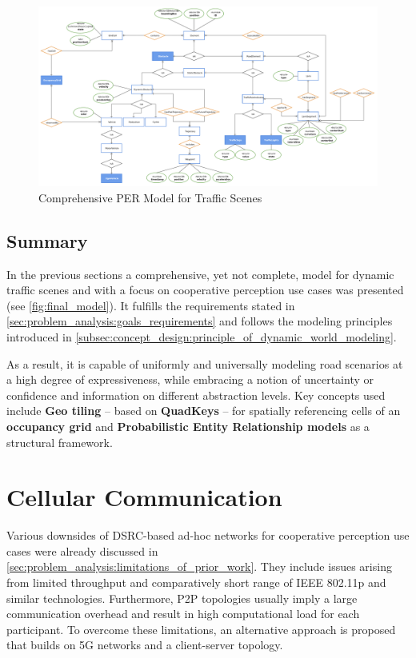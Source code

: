 \begin{figure}
	\centering
	\includegraphics[width=\linewidth]{98_images/scene_representation_er}
	\caption{Comprehensive PER Model for Traffic Scenes}
	\label{fig:final_model}
\end{figure}

\subsection{Summary}
\label{subsec:concept_design:modeling:summary}
In the previous sections a comprehensive, yet not complete, model for dynamic traffic scenes and with a focus on cooperative perception use cases was presented (see \autoref{fig:final_model}). It fulfills the requirements stated in \autoref{sec:problem_analysis:goals_requirements} and follows the modeling principles introduced in \autoref{subsec:concept_design:principle_of_dynamic_world_modeling}.

As a result, it is capable of uniformly and universally modeling road scenarios at a high degree of expressiveness, while embracing a notion of uncertainty or confidence and information on different abstraction levels. Key concepts used include \textbf{Geo tiling} – based on \textbf{QuadKeys} – for spatially referencing cells of an \textbf{occupancy grid} and \textbf{Probabilistic Entity Relationship models} as a structural framework.

\section{Cellular Communication}
\label{sec:concept_design:cellular_communication}
Various downsides of DSRC-based ad-hoc networks for cooperative perception use cases were already discussed in \autoref{sec:problem_analysis:limitations_of_prior_work}. They include issues arising from limited throughput and comparatively short range of IEEE 802.11p and similar technologies. Furthermore, P2P topologies usually imply a large communication overhead and result in high computational load for each participant. To overcome these limitations, an alternative approach is proposed that builds on 5G networks and a client-server topology.

